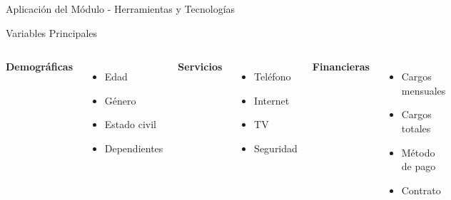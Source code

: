 \begin{frame}{Aplicación del Módulo - Herramientas y Tecnologías}
    \vsp
    \begin{exampleblock}{Variables Principales}
        \begin{columns}
            \textbf{Demográficas}
            \begin{itemize}
                \item Edad
                \item Género
                \item Estado civil
                \item Dependientes
            \end{itemize}
            \textbf{Servicios}
            \begin{itemize}
                \item Teléfono
                \item Internet
                \item TV
                \item Seguridad
            \end{itemize}
            \textbf{Financieras}
            \begin{itemize}
                \item Cargos mensuales
                \item Cargos totales
                \item Método de pago
                \item Contrato
            \end{itemize}
        \end{columns}
    \end{exampleblock}
\end{frame}

